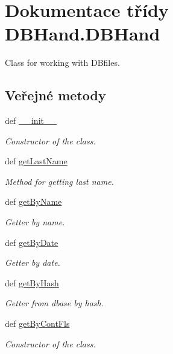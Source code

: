 \hypertarget{classDBHand_1_1DBHand}{\section{Dokumentace třídy D\-B\-Hand.\-D\-B\-Hand}
\label{classDBHand_1_1DBHand}
}


Class for working with D\-Bfiles.  


\subsection*{Veřejné metody}
\begin{DoxyCompactItemize}
\item 
def \hyperlink{classDBHand_1_1DBHand_a1da352dfe2f9be2bcb8dbc77e39b0da6}{\-\_\-\-\_\-init\-\_\-\-\_\-}
\begin{DoxyCompactList}\small\item\em Constructor of the class. \end{DoxyCompactList}\item 
def \hyperlink{classDBHand_1_1DBHand_a07a9d7a56e3aad6a2fb055afd3016a05}{get\-Last\-Name}
\begin{DoxyCompactList}\small\item\em Method for getting last name. \end{DoxyCompactList}\item 
def \hyperlink{classDBHand_1_1DBHand_af89e646985e27bb33622fbcf3d984d0d}{get\-By\-Name}
\begin{DoxyCompactList}\small\item\em Getter by name. \end{DoxyCompactList}\item 
def \hyperlink{classDBHand_1_1DBHand_a8e5cad73cd8440972885d7c7ac0328e2}{get\-By\-Date}
\begin{DoxyCompactList}\small\item\em Getter by date. \end{DoxyCompactList}\item 
def \hyperlink{classDBHand_1_1DBHand_ac7b5609f896d7e3b9e59fca09c521396}{get\-By\-Hash}
\begin{DoxyCompactList}\small\item\em Getter from dbase by hash. \end{DoxyCompactList}\item 
def \hyperlink{classDBHand_1_1DBHand_aaba58e5004798661d7d3cb5566ad1a45}{get\-By\-Cont\-Fls}
\begin{DoxyCompactList}\small\item\em Constructor of the class. \end{DoxyCompactList}\item 

\end{DoxyCompactItemize}
